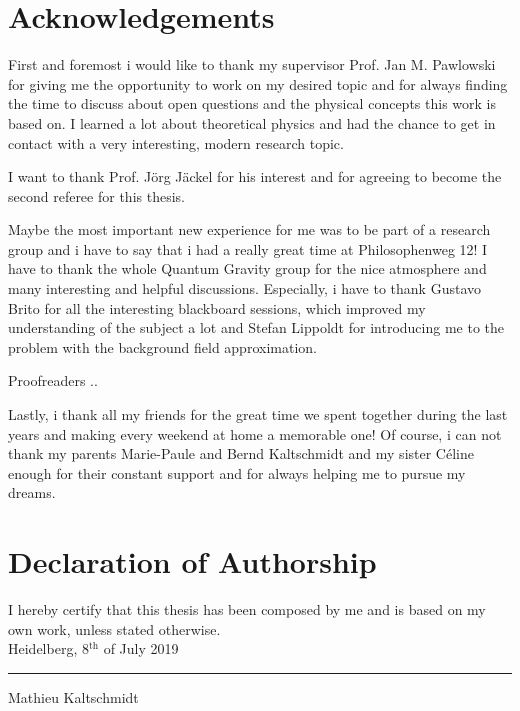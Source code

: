 \thispagestyle{plain}
\section*{Acknowledgements}
First and foremost i would like to thank my supervisor Prof. Jan M. Pawlowski for giving me the opportunity to work on my desired topic and for always finding the time to discuss about open questions and the physical concepts this work is based on. I learned a lot about theoretical physics and had the chance to get in contact with a very interesting, modern research topic. 

I want to thank Prof. J\"org J\"ackel for his interest and for agreeing to become the second referee for this thesis.

Maybe the most important new experience for me was to be part of a research group and i have to say that i had a really great time at Philosophenweg 12! I have to thank the whole Quantum Gravity group for the nice atmosphere and many interesting and helpful discussions.  Especially, i have to thank Gustavo Brito for all the interesting blackboard sessions, which improved  my understanding of the subject a lot and Stefan Lippoldt for introducing me  to the problem with the background field approximation.

Proofreaders ..


Lastly, i thank all my friends for the great time we spent together during the last years and making every weekend at home a memorable one! Of course, i can not thank my parents Marie-Paule and Bernd Kaltschmidt and my sister C\'{e}line enough for their constant support and for always helping me to pursue my dreams.  
 

\section*{Declaration of Authorship}
I hereby certify that this thesis has been composed by me and is based on my own work, unless stated otherwise.\\

Heidelberg, 8$^{\mathrm{th}}$ of July 2019 \hfill \rule{60mm}{.15mm} \par \vspace{-0.4cm}
\hfill Mathieu Kaltschmidt

